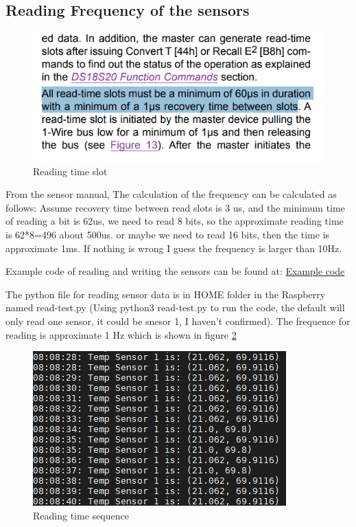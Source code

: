 \documentclass{article}
\begin{document}
\subsection{Reading Frequency of the sensors}
\begin{figure}
\begin{center}
\includegraphics[scale=0.6]{sensor_manual.png}
\end{center}
\caption{Reading time slot}
\label{fig:readingtimeslot}
\end{figure}
From the sensor manual, The calculation of the frequency can be calculated as follows: Assume recovery time between read slots is 3 us, and the minimum time of reading a bit is 62us, we need to read 8 bits, so the approximate reading time is 62*8=496 about 500us.
or maybe we need to read 16 bits, then the time is approximate 1ms. If nothing is wrong I guess the frequency is larger than 10Hz.

Example code of reading and writing the sensors can be found at: \href{https://www.maximintegrated.com/en/design/technical-documents/app-notes/1/162.html}{Example code}

The python file for reading sensor data is in HOME folder in the Raspberry named read-test.py (Using python3 read-test.py to run the code, the default will only read one sensor, it could be snesor 1, I haven't confirmed). 
The frequence for reading is approximate 1 Hz which is shown in figure \ref{fig:readingtime}

\begin{figure}
\begin{center}
\includegraphics[scale=0.6]{sensorReadingTime.png}
\end{center}
\caption{Reading time sequence}
\label{fig:readingtime}
\end{figure}
\end{document}
